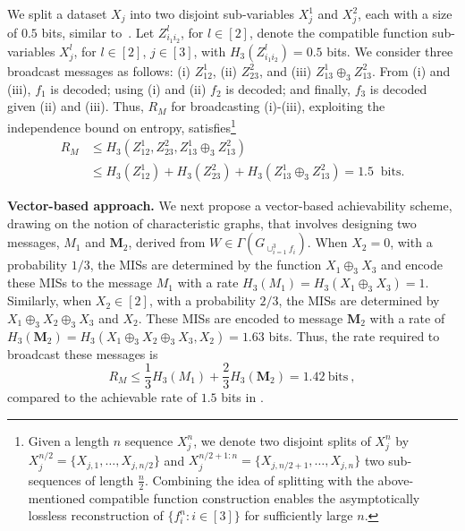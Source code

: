 \documentclass[conference, letterpaper]{IEEEtran} %
\begin{document}
\begin{ex}
We split a dataset $X_j$ into two disjoint sub-variables $X_j^1$ and $X_j^2$, each with a size of $0.5$ bits, similar to~\cite[Example~2]{yao2024capacity}.   
Let $Z_{{i_1}{i_2}}^l$, for $l\in[2]$, denote the compatible function sub-variables $X_{j}^{l}$, for $l\in[2]$, $j\in[3]$, with $H_3(Z_{{i_1}{i_2}}^l)=0.5$ bits. We consider three broadcast messages as follows: (i) $Z_{12}^1$, (ii) $Z_{23}^2$, and (iii) $Z_{13}^1 \oplus_3 Z_{13}^2$. From (i) and (iii), $f_1$ is decoded; using (i) and (ii) $f_2$ is decoded; and finally, $f_3$ is decoded given (ii) and (iii). Thus, $R_{M}$ for broadcasting (i)-(iii), exploiting the independence bound on entropy, satisfies\footnote{Given a length $n$ sequence $X_j^n$, we denote two disjoint splits of $X_j^n$ by $X_j^{{n}/{2}} = \{X_{j,1}, \dots, X_{j,{n}/{2}}\}$ and $X_{j}^{{n}/{2}+1:n}=\{X_{j,{n}/{2}+1}, \dots, X_{j,n}\}$ two sub-sequences of length $\frac{n}{2}$. Combining the idea of splitting with the above-mentioned compatible function construction enables the asymptotically lossless reconstruction of $\{f_i^n: i\in[3]\}$ for sufficiently large $n$.} 
 \begin{align}
 \label{ex-lineaer-rate-split}
 R_M&\leq H_3(Z_{12}^{1},Z_{23}^{2},Z_{13}^{1}\oplus_{3}Z_{13}^{2})\nonumber\\
 &\leq H_3(Z_{12}^{1})+H_{3}(Z_{23}^{2})+H_{3}(Z_{13}^{1}\oplus_{3}Z_{13}^{2})=1.5\:\text{ bits} .\nonumber
 \end{align}


{\bf Vector-based approach.}   
We next propose a vector-based achievability scheme, drawing on the notion of characteristic graphs, that involves designing two messages, $M_{1}$ and $\textbf{M}_{2}$, derived from $W\in\Gamma(G_{\cup_{i=1}^{3}f_{i}})$. When $X_{2}=0$, with a probability $1/3$, the MISs are determined by the function $X_{1}\oplus_{3}X_{3}$ and encode these MISs to the message $M_{1}$ with a rate $H_3(M_{1})=H_3(X_{1}\oplus_3 X_{3})=1$. Similarly, when $X_{2}\in [2]$, with a probability $2/3$, the MISs are determined by $X_1\oplus_{3}X_{2}\oplus_{3} X_{3}$ and $X_{2}$. These MISs are encoded to message $\textbf{M}_{2}$ with a rate of $H_3(\textbf{M}_{2})=H_{3}(X_1\oplus_3 X_{2}\oplus_{3} X_{3}, X_{2})=1.63$ bits. Thus, the rate required to broadcast these messages is
\begin{equation}
    R_M\leq\frac{1}{3}H_{3}(M_{1})+\frac{2}{3}H_{3}(\textbf{M}_{2})=1.42\: \text{bits} \ ,
\end{equation}
compared to the achievable rate of $1.5$ bits in \cite[Example~2]{yao2024capacity}.
\end{ex}
\end{document}
